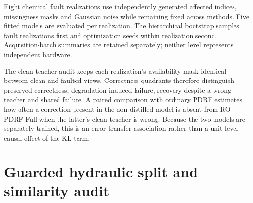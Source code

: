 \documentclass[10pt]{article}
\begin{document}
Eight chemical fault realizations use independently generated affected indices, missingness masks and Gaussian noise while remaining fixed across methods. Five fitted models are evaluated per realization. The hierarchical bootstrap samples fault realizations first and optimization seeds within realization second. Acquisition-batch summaries are retained separately; neither level represents independent hardware.

\begin{table}[ht]
\centering
\caption{Chemical affected-AUROC contrasts across eight fixed fault realizations. Intervals use the fault-realization--seed hierarchy.}
\resizebox{0.88\textwidth}{!}{}
\end{table}

\begin{table}[ht]
\centering
\caption{RO-PDRF-Full minus RO-CAGF affected-AUROC by acquisition batch across fault realizations and seeds.}
\resizebox{0.76\textwidth}{!}{}
\end{table}

The clean-teacher audit keeps each realization's availability mask identical between clean and faulted views. Correctness quadrants therefore distinguish preserved correctness, degradation-induced failure, recovery despite a wrong teacher and shared failure. A paired comparison with ordinary PDRF estimates how often a correction present in the non-distilled model is absent from RO-PDRF-Full when the latter's clean teacher is wrong. Because the two models are separately trained, this is an error-transfer association rather than a unit-level causal effect of the KL term.

\begin{table}[ht]
\centering
\caption{Clean-teacher and faulted-prediction correctness quadrants across five models and eight realizations.}
\resizebox{0.65\textwidth}{!}{}
\end{table}

\begin{table}[ht]
\centering
\caption{Teacher-confidence audit. $\Delta p_y$ is RO-PDRF-Full minus PDRF true-class probability on the faulted observation.}
\resizebox{0.95\textwidth}{!}{}
\end{table}
\FloatBarrier

\section{Guarded hydraulic split and similarity audit}
\end{document}
